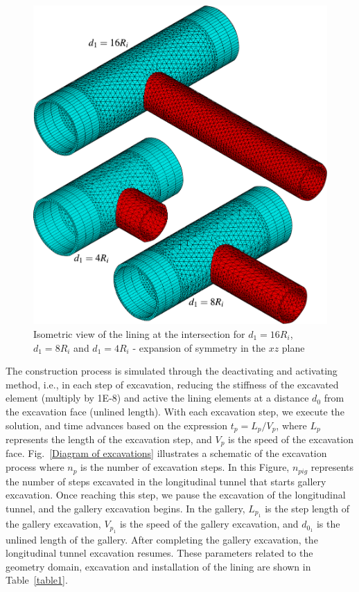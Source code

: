 \documentclass[a4paper,fleqn]{cas-sc}
\begin{document}
\begin{figure}[h!]
	\centering
	\includegraphics[scale=0.6]{Mesh6.pdf}
	\caption{Isometric view of the lining at the intersection for $d_1=16R_i$, $d_1=8R_i$ and $d_1=4R_i$ - expansion of symmetry in the $xz$ plane}
	\label{Mesh6}
\end{figure}
\FloatBarrier
The construction process is simulated through the deactivating and activating method, i.e., in each step of excavation, reducing the stiffness of the excavated element (multiply  by 1E-8) and active the lining elements at a distance $d_0$ from the excavation face (unlined length). With each excavation step, we execute the solution, and time advances based on the expression $t_p=L_p/V_p$, where $L_p$ represents the length of the excavation step, and $V_p$ is the speed of the excavation face. Fig.~\ref{Diagram of excavations} illustrates a schematic of the excavation process where $n_p$ is the number of excavation steps. In this Figure, $n_{pig}$ represents the number of steps excavated in the longitudinal tunnel that starts gallery excavation. Once reaching this step, we pause the excavation of the longitudinal tunnel, and the gallery excavation begins. In the gallery, $L_{p_1}$ is the step length of the gallery excavation, $V_{p_1}$ is the speed of the gallery excavation, and $d_{0_1}$ is the unlined length of the gallery. After completing the gallery excavation, the longitudinal tunnel excavation resumes. These parameters related to the geometry domain, excavation and installation of the lining are shown in Table~\ref{table1}.
\end{document}
